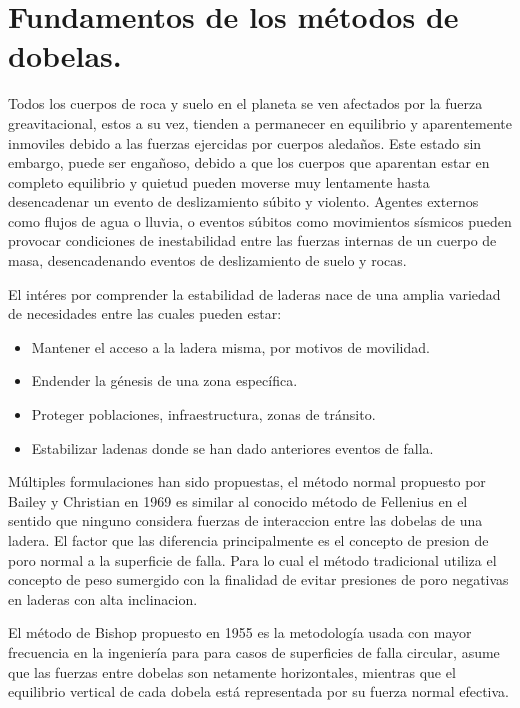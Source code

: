 \chapter{Fundamentos de los m\'etodos de dobelas.}

Todos los cuerpos de roca y suelo en el planeta se ven afectados por la fuerza greavitacional, estos a su vez, tienden a permanecer en equilibrio y aparentemente inmoviles debido a las fuerzas ejercidas por cuerpos aleda\~nos. Este estado sin embargo, puede ser enga\~noso, debido a que los cuerpos que aparentan estar en completo equilibrio y quietud pueden moverse muy lentamente hasta desencadenar un evento de deslizamiento s\'ubito y violento.
Agentes externos como flujos de agua o lluvia, o eventos súbitos como movimientos s\'ismicos pueden provocar condiciones de inestabilidad entre las fuerzas internas de un cuerpo de masa, desencadenando eventos de deslizamiento de suelo y rocas.

El int\'eres por comprender la estabilidad de laderas nace de una amplia variedad de necesidades entre las cuales pueden estar:

\begin{itemize}
  \item Mantener el acceso a la ladera misma, por motivos de movilidad.
  \item Endender la g\'enesis de una zona espec\'ifica.
  \item Proteger poblaciones, infraestructura, zonas de tr\'ansito.
  \item Estabilizar ladenas donde se han dado anteriores eventos de falla.
\end{itemize}

M\'ultiples formulaciones han sido propuestas, el m\'etodo normal propuesto por Bailey y Christian en 1969 es similar al conocido m\'etodo de Fellenius en el sentido que ninguno considera fuerzas de interaccion entre las dobelas de una ladera.
El factor que las diferencia principalmente es el concepto de presion de poro normal a la superficie de falla. Para lo cual el m\'etodo tradicional utiliza el concepto de peso sumergido con la finalidad de evitar presiones de poro negativas en laderas con alta inclinacion.

El m\'etodo de Bishop propuesto en 1955 es la metodolog\'ia usada con mayor frecuencia en la ingenier\'ia para para casos de superficies de falla circular, asume que las fuerzas entre dobelas son netamente horizontales, mientras que el equilibrio vertical de cada dobela est\'a representada por su fuerza normal efectiva.

